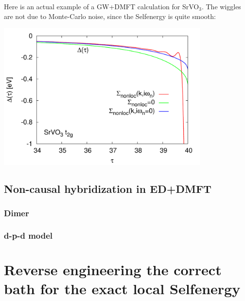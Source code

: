 \documentclass[12pt,a4paper]{scrartcl}
\numberwithin{equation}{section}
\begin{document}
Here is an actual example of a GW+DMFT calculation for SrVO$_3$. The wiggles are not due to Monte-Carlo noise,
since the Selfenergy is quite smooth:

\begin{center}
\includegraphics[width=0.8\textwidth]{figs/svo_noncausal/delta.pdf}\end{center}


\subsection{Non-causal hybridization in ED+DMFT}

\subsubsection{Dimer}

\subsubsection{d-p-d model}



\section{Reverse engineering the correct bath for the exact local Selfenergy}
\end{document}
